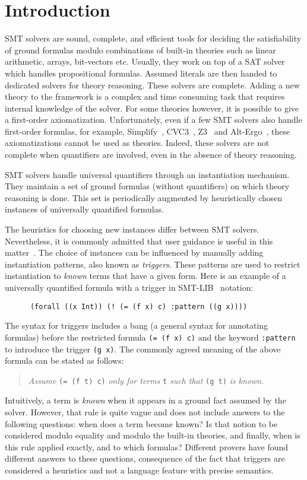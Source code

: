 \documentclass[]{easychair}
\newcommand{\beforesec}{\vspace{0cm}}
\newcommand{\aftersec}{\vspace{0cm}}
\begin{document}
\beforesec
\section{Introduction}
\aftersec

SMT solvers are sound, complete, and efficient tools for deciding the
satisfiability of ground formulas modulo combinations of built-in
theories such as linear arithmetic, arrays, bit-vectors etc. Usually, they work
on top of a SAT solver which handles propositional formulas. Assumed literals
are then handed to dedicated solvers for theory reasoning. These solvers are
complete. Adding a new theory to the framework is a complex and time consuming
task that requires internal knowledge of the solver. For some theories however,
it is possible to give a first-order axiomatization. Unfortunately, even if a
few SMT solvers also handle first-order formulas, for example,
Simplify~\cite{Simplify}, CVC3~\cite{CVC3}, Z3~\cite{Z3} and
Alt-Ergo~\cite{altergo}, these axiomatizations cannot be used as theories.
Indeed, these solvers are not complete when quantifiers are involved, even in
the absence of theory reasoning.

SMT solvers handle universal quantifiers through an
instantiation mechanism. They maintain a set of ground formulas (without
quantifiers) on
which theory reasoning is done. This set is periodically augmented by
heuristically chosen instances of universally quantified formulas.

The heuristics for choosing new instances differ between SMT
solvers.
Nevertheless, it is commonly admitted that user guidance is
useful in this matter~\cite{Simplify,moskal-2009}. The choice of instances can
be influenced by manually adding instantiation
patterns, also known as \emph{triggers}. These patterns are used to restrict
instantiation to \emph{known} terms that have a given form.
Here is an example of a universally quantified formula with
a trigger in SMT-LIB~\cite{smtlib} notation:
\begin{verbatim}
      (forall ((x Int)) (! (= (f x) c) :pattern ((g x))))
\end{verbatim}
The syntax for triggers includes a bang (a general syntax for annotating
formulas) before the restricted formula \texttt{(=
(f x) c)} and the keyword \texttt{:pattern} to introduce the trigger
\texttt{(g x)}.
  The commonly agreed meaning of the above formula can be stated as
  follows:

  \begin{quote}
    \emph{Assume} \texttt{(= (f t) c)} \emph{only for terms}
    \texttt{t} \emph{such that} \texttt{(g t)} \emph{is known}.
  \end{quote}
%
  Intuitively, a term is \emph{known} when it appears in a ground fact
  assumed by the solver. However, that rule is quite vague and does not include
answers to the
following questions: when does a term become known? Is that notion to be
considered modulo equality and modulo the built-in theories, and
finally, when is this rule applied exactly, and to which formulas?
Different provers have found different answers to these questions,
consequence of the fact that triggers are considered a heuristics and
not a language feature with precise semantics.
\end{document}
